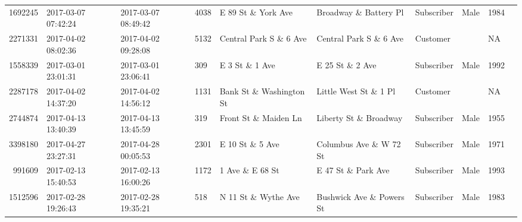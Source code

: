 \documentclass[11pt]{article}
\begin{document}
\begin{description}
\begin{tabular}{r|lllllllll}
	 1692245                          & 2017-03-07 07:42:24              & 2017-03-07 08:49:42              & 4038                             & E 89 St \& York Ave             & Broadway \& Battery Pl          & Subscriber                       & Male                             & 1984                            \\
	 2271331                          & 2017-04-02 08:02:36              & 2017-04-02 09:28:08              & 5132                             & Central Park S \& 6 Ave         & Central Park S \& 6 Ave         & Customer                         &                                  &   NA                            \\
	 1558339                          & 2017-03-01 23:01:31              & 2017-03-01 23:06:41              &  309                             & E 3 St \& 1 Ave                 & E 25 St \& 2 Ave                & Subscriber                       & Male                             & 1992                            \\
	 2287178                          & 2017-04-02 14:37:20              & 2017-04-02 14:56:12              & 1131                             & Bank St \& Washington St        & Little West St \& 1 Pl          & Customer                         &                                  &   NA                            \\
	 2744874                          & 2017-04-13 13:40:39              & 2017-04-13 13:45:59              &  319                             & Front St \& Maiden Ln           & Liberty St \& Broadway          & Subscriber                       & Male                             & 1955                            \\
	 3398180                          & 2017-04-27 23:27:31              & 2017-04-28 00:05:53              & 2301                             & E 10 St \& 5 Ave                & Columbus Ave \& W 72 St         & Subscriber                       & Male                             & 1971                            \\
	  991609                          & 2017-02-13 15:40:53              & 2017-02-13 16:00:26              & 1172                             & 1 Ave \& E 68 St                & E 47 St \& Park Ave             & Subscriber                       & Male                             & 1993                            \\
	 1512596                          & 2017-02-28 19:26:43              & 2017-02-28 19:35:21              &  518                             & N 11 St \& Wythe Ave            & Bushwick Ave \& Powers St       & Subscriber                       & Male                             & 1983                            \\

\end{tabular}
\end{description}
\end{document}

